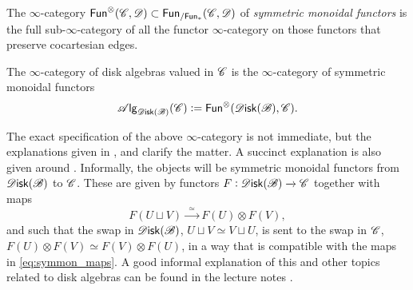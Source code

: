 \documentclass[../text]{subfiles}
\begin{document}
The $\infty$-category $\mathsf{Fun}^{\otimes}(\mathscr{C},\mathscr{D})\subset\mathsf{Fun}_{/\mathsf{Fun}_\ast}(\mathscr{C},\mathscr{D})$ of \emph{symmetric monoidal functors} is the full sub-$\infty$-category of all the functor $\infty$-category on those functors that preserve cocartesian edges.

\begin{definition}
    The $\infty$-category of disk algebras valued in $\mathscr{C}$ is the $\infty$-category of symmetric monoidal functors
    \begin{equation}
        \alg{\disk(\bstr)} (\catC) := \mathsf{Fun}^{\otimes}(\disk(\bstr), \catC).
    \end{equation}
\end{definition}


\begin{remark}
    The exact specification of the above $\infty$-category is not immediate, but the explanations given in \cite[def.2.0.0.7]{lurie_ha}, \cite[rem.2.1.2.19]{lurie_ha} and \cite[def.2.1.3.7]{lurie_ha} clarify the matter. A succinct explanation is also given around \cite[def.1.11]{aft_fhstrat}. Informally, the objects will be symmetric monoidal functors from $\disk(\bstr)$ to $\mathscr{C}$. These are given by functors $F:\disk(\bstr) \xrightarrow{} \catC$ together with maps
    \begin{equation}\label{eq:symmon_maps}
        F(U \sqcup V) \xrightarrow{\ \ \simeq \ \ } F(U) \otimes F(V),
    \end{equation}
    and such that the swap in $\disk(\bstr)$, $U \sqcup V \simeq V \sqcup U$, is sent to the swap in $\mathscr{C}$, $F(U) \otimes F(V) \simeq F(V) \otimes F(U)$, in a way that is compatible with the maps in \eqref{eq:symmon_maps}. A good informal explanation of this and other topics related to disk algebras can be found in the lecture notes \cite{tanaka20}.
\end{remark}
\end{document}
